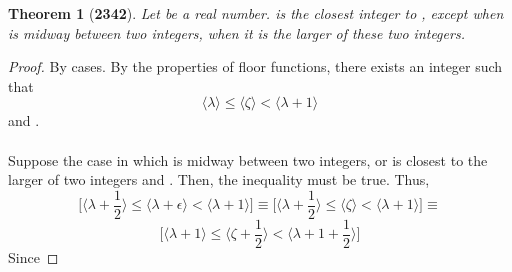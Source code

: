 \documentclass[preview]{standalone}
\newtheorem*{theorem*}{Theorem}
\begin{document}
\begin{theorem*}[\textbf{2342}]
    Let \bm{$\zeta$} be a real number. 
    is the closest integer to \bm{$\zeta$}, 
    except when \bm{$\zeta$} is midway between two integers, 
    when it is the larger of these two integers.
\end{theorem*}

\begin{proof}
    By cases. By the properties of floor functions, 
    there exists an integer \bm{$\lambda$} such that 
    \begin{equation*}
        \Big \langle \lambda \Big \rangle
            \le 
        \Big \langle \zeta \Big \rangle
            < 
        \Big \langle \lambda + 1 \Big \rangle
    \end{equation*}
    and 
    \bm{$\zeta - \lfloor \zeta \rfloor = \epsilon$}.
    \\ \\
     Suppose the case in which \bm{$\zeta$} is midway between two integers, 
    or is closest to the larger of two integers \bm{$\lambda$} and 
    \bm{$\big \langle \lambda + 1 \big \rangle$}. 
    Then, the inequality  must be true. Thus, 
    \begin{equation*}
        \bigg[
            \Big \langle
                \lambda + \frac{1}{2}
            \Big \rangle
                \leq 
            \Big \langle
                \lambda + \epsilon
            \Big \rangle
                <
            \Big \langle
                \lambda + 1
            \Big \rangle
        \bigg]
            \equiv
        \bigg[
            \Big \langle    
                \lambda + \frac{1}{2}
            \Big \rangle
                \leq
            \Big \langle
                \zeta
            \Big \rangle
                <
            \Big \langle
                \lambda + 1
            \Big \rangle
        \bigg]
            \equiv
    \end{equation*}
    \begin{equation*}
        \bigg[
            \Big \langle 
                \lambda + 1
            \Big \rangle
                \leq
            \Big \langle 
                \zeta + \frac{1}{2}
            \Big \rangle
                <
            \Big \langle
                \lambda + 1 + \frac{1}{2}
            \Big \rangle
        \bigg]
    \end{equation*}
    Since 
\end{proof}
\end{document}
